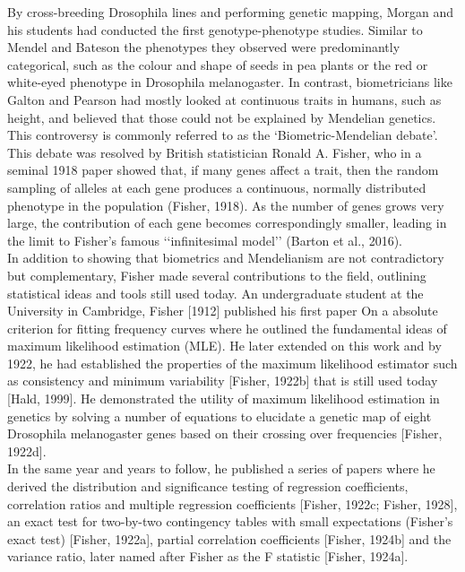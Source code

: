 By cross-breeding Drosophila lines and performing genetic mapping, Morgan and his students had conducted the first genotype-phenotype studies. 
Similar to Mendel and Bateson the phenotypes they observed were predominantly categorical, such as the colour and shape of seeds in pea plants or the red or white-eyed phenotype in Drosophila melanogaster. 
In contrast, biometricians like Galton and Pearson had mostly looked at continuous traits in humans, such as height, and believed that those could not be explained by Mendelian genetics.
This controversy is commonly referred to as the ‘Biometric-Mendelian debate’.\\ 

This debate was resolved by British statistician Ronald A. Fisher, who in a seminal 1918 paper showed that, if many genes affect a trait, then the random sampling of alleles at each gene produces a continuous, normally distributed phenotype in the population (Fisher, 1918). 
As the number of genes grows very large, the contribution of each gene becomes correspondingly smaller, leading in the limit to Fisher’s famous ‘‘infinitesimal model’’ (Barton et al., 2016).\\

In addition to showing that biometrics and Mendelianism are not contradictory but complementary, Fisher made several contributions to the field, outlining statistical ideas and tools still used today. 
An undergraduate student at the University in Cambridge, Fisher [1912] published his first paper On a absolute criterion for fitting frequency curves where he outlined the fundamental ideas of maximum likelihood estimation (MLE). 
He later extended on this work and by 1922, he had established the properties of the maximum likelihood estimator such as consistency and minimum variability [Fisher, 1922b] that is still used today [Hald, 1999]. 
He demonstrated the utility of maximum likelihood estimation in genetics by solving a number of equations to elucidate a genetic map of eight Drosophila melanogaster genes based on their crossing over frequencies [Fisher, 1922d].\\ 

In the same year and years to follow, he published a series of papers where he derived the distribution and significance testing of regression coefficients, correlation ratios and multiple regression coefficients [Fisher, 1922c; Fisher, 1928], an exact test for two-by-two contingency tables with small expectations (Fisher’s exact test) [Fisher, 1922a], partial correlation coefficients [Fisher, 1924b] and the variance ratio, later named after Fisher as the F statistic [Fisher, 1924a]. 

